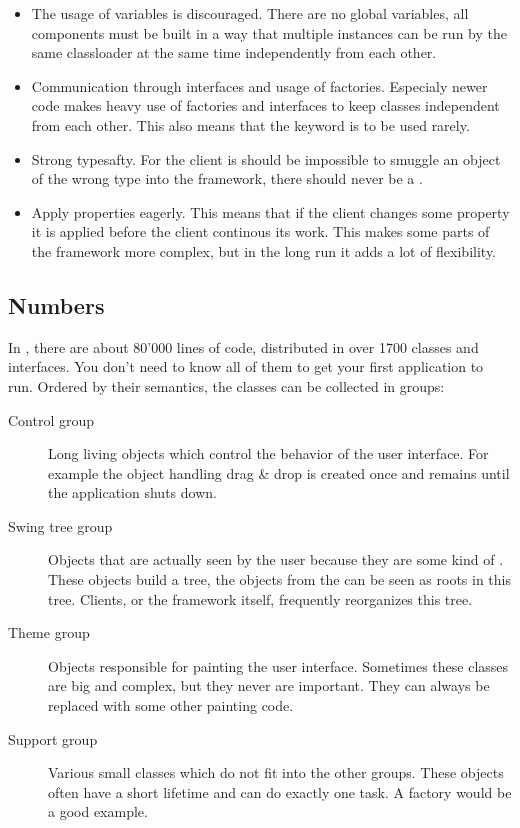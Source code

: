 \begin{itemize}
 \item The usage of  variables is discouraged. There are no global variables, all components must be built in a way that multiple instances can be run by the same classloader at the same time independently from each other.
 \item Communication through interfaces and usage of factories. Especialy newer code makes heavy use of factories and interfaces to keep classes independent from each other. This also means that the keyword  is to be used rarely.
 \item Strong typesafty. For the client is should be impossible to smuggle an object of the wrong type into the framework, there should never be a .
 \item Apply properties eagerly. This means that if the client changes some property it is applied before the client continous its work. This makes some parts of the framework more complex, but in the long run it adds a lot of flexibility.
\end{itemize}

\subsection{Numbers}
In , there are about 80'000 lines of code, distributed in over 1700 classes and interfaces. You don't need to know all of them to get your first application to run. Ordered by their semantics, the classes can be collected in groups:

\begin{description}
 \item[Control group] Long living objects which control the behavior of the user interface. For example the object handling drag \& drop is created once and remains until the application shuts down.
 \item[Swing tree group] Objects that are actually seen by the user because they are some kind of . These objects build a tree, the objects from the  can be seen as roots in this tree. Clients, or the framework itself, frequently reorganizes this tree.
 \item[Theme group] Objects responsible for painting the user interface. Sometimes these classes are big and complex, but they never are important. They can always be replaced with some other painting code.
 \item[Support group] Various small classes which do not fit into the other groups. These objects often have a short lifetime and can do exactly one task. A factory would be a good example.
\end{description}

